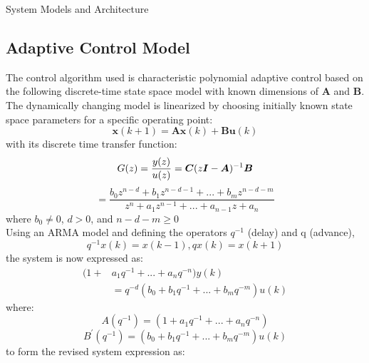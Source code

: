 \begin{section}{System Models and Architecture}
\subsection{Adaptive Control Model}
The control algorithm used is characteristic polynomial adaptive control  based on the following discrete-time state space model with known dimensions of $\bm{A}$ and $\bm{B}$. The dynamically changing model is linearized by choosing initially known state space parameters for a specific operating point:
	\begin{equation}
	\bm{x}(k+1) = \bm{A}\bm{x}(k) + \bm{B}\bm{u}(k)
	\end{equation}
with its discrete time transfer function:
	\begin{equation}
        G(z) = \frac{y(z)}{u(z)} = \bm{C}(z\bm{I}-\bm{A})^{-1}\bm{B} \nonumber \\
    \end{equation}
    \begin{equation}
	= \frac{b_0z^{n-d}+b_1z^{n-d-1} +...+b_mz^{n-d-m}}{z^{n}+a_1z^{n-1}+...+a_{n-1}z+a_n}
	\end{equation}
where $b_0\ne{0}$, $d>0$, and $n-d-m\geq{0}$\\
Using an ARMA  model and defining the operators $q^{-1}$ (delay) and q (advance),
	\begin{equation}
	q^{-1}x(k) = x(k-1), qx(k) = x(k+1)
	\end{equation}
the system is now expressed as:
    \begin{align}
	(1+&a_1q^{-1}+...+a_nq^{-n})y(k) \nonumber \\
	&=q^{-d}(b_0+b_1q^{-1}+...+b_mq^{-m})u(k)
	\end{align}
where:
	\begin{equation}
	A(q^{-1})=(1+a_1q^{-1}+...+a_nq^{-n}) \nonumber
	\end{equation}
	\begin{equation}
	B^{'}(q^{-1})=(b_0+b_1q^{-1}+...+b_mq^{-m})u(k) \nonumber
	\end{equation}
to form the revised system expression as:
	\begin{equation}

\end{equation}
\end{section}
